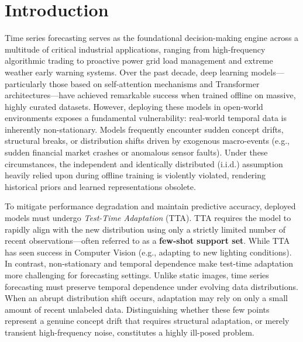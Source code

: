 \documentclass{article}
\begin{document}
	\section{Introduction}

	Time series forecasting serves as the foundational decision-making engine across a multitude of critical industrial applications, ranging from high-frequency algorithmic trading to proactive power grid load management and extreme weather early warning systems. Over the past decade, deep learning models---particularly those based on self-attention mechanisms and Transformer architectures---have achieved remarkable success when trained offline on massive, highly curated datasets\cite{kim2024self, woo2024unified}. However, deploying these models in open-world environments exposes a fundamental vulnerability: real-world temporal data is inherently non-stationary\cite{dai2024ddn, ye2024frequency}. Models frequently encounter sudden concept drifts, structural breaks, or distribution shifts driven by exogenous macro-events\cite{liu2024time} (e.g., sudden financial market crashes or anomalous sensor faults). Under these circumstances, the independent and identically distributed (i.i.d.) assumption heavily relied upon during offline training is violently violated, rendering historical priors and learned representations obsolete\cite{liu2024time, woo2024unified}.
	
	To mitigate performance degradation and maintain predictive accuracy, deployed models must undergo \textit{Test-Time Adaptation} (TTA)\cite{yuan2024tea, wang2025test}. TTA requires the model to rapidly align with the new distribution using only a strictly limited number of recent observations\cite{karmanov2024efficient, zhang2024test, wang2025test}---often referred to as a \textbf{few-shot support set}. While TTA has seen success in Computer Vision (e.g., adapting to new lighting conditions)\cite{karmanov2024efficient, yuan2024tea, ma2024improved}. In contrast, non-stationary and temporal dependence make test-time adaptation more challenging for forecasting settings\cite{liu2024time, dai2024ddn}. Unlike static images, time series forecasting must preserve temporal dependence under evolving data distributions\cite{liu2024time, woo2024unified, dai2024ddn}. When an abrupt distribution shift occurs, adaptation may rely on only a small amount of recent unlabeled data\cite{zhang2024test, wang2025test}. Distinguishing whether these few points represent a genuine concept drift that requires structural adaptation, or merely transient high-frequency noise, constitutes a highly ill-posed problem.
	
\end{document}
